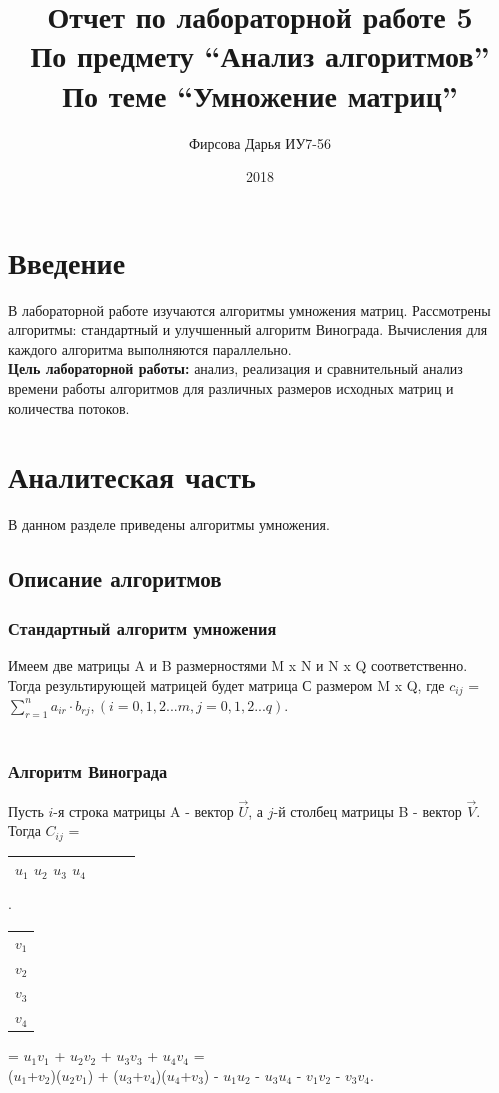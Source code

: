 \documentclass[12pt]{article}
\title{Отчет по лабораторной работе 5 \\ 
	По предмету “Анализ алгоритмов” \\
	По теме “Умножение матриц”
}
\date{2018}
\author{Фирсова Дарья ИУ7-56}
\begin{document}
  
	\maketitle  
	\newpage
	\section*{Введение}
	В лабораторной работе изучаются алгоритмы умножения матриц. Рассмотрены алгоритмы: стандартный и улучшенный алгоритм Винограда.  Вычисления для каждого алгоритма выполняются параллельно. \\
	\textbf{Цель лабораторной работы:} анализ, реализация и сравнительный анализ времени работы алгоритмов для различных размеров исходных матриц и количества потоков. \\
\newpage

\section{Аналитеская часть}
В данном разделе приведены алгоритмы умножения.
\subsection{Описание алгоритмов}

\subsubsection{Стандартный алгоритм умножения }

Имеем две матрицы A и B размерностями M x N и N x Q соответственно. \\Тогда результирующей матрицей будет матрица С размером M x Q, где $c_{ij}$ = $\sum_{r=1}^n a_{ir}\cdot b_{rj} ,   (i = 0,1,2...m, j = 0,1,2...q)$.
\\
\\
\subsubsection{Алгоритм Винограда}
Пусть $i$-я строка матрицы A - вектор  $\vec{U}$, а $j$-й столбец матрицы B - вектор $\vec{V}$. \\
Тогда $C_{ij}$ = \begin{tabular}{|c|c|c|c|}
	\hline
	$u_{1}$  $u_{2}$  $u_{3}$  $u_{4}$ \\
	\hline
\end{tabular} $\cdot$ 
\begin{tabular}{|c|}
	\hline
	$v_{1}$ \\
	$v_{2}$  \\
	$v_{3}$   \\
	$v_{4}$  \\
	\hline
\end{tabular}
= $u_{1}$$v_{1}$ + $u_{2}$$v_{2}$ + $u_{3}$$v_{3}$ + $u_{4}$$v_{4}$ = \\
($u_{1}$+$v_{2}$)($u_{2}$$v_{1}$) + ($u_{3}$+$v_{4}$)($u_{4}$+$v_{3}$) - $u_{1}$$u_{2}$ - $u_{3}$$u_{4}$ - $v_{1}$$v_{2}$ - $v_{3}$$v_{4}$. \\
\end{document}
